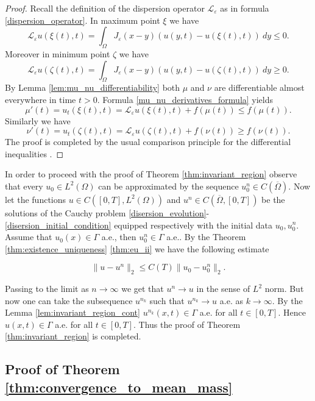 \documentclass[12pt, a4paper]{article}
\theoremstyle{break}
\theoremstyle{break}
\theoremstyle{break}
\theoremstyle{break}
\theoremstyle{break}
\newcommand{\Leo}{\mathcal{L}_{\varepsilon}}
\newcommand{\Leb}{L^2\left(\Omega\right)}
\begin{document}
\begin{proof}
    Recall the definition of the dispersion operator $\Leo$ as in formula \eqref{dispersion_operator}. In maximum point $\xi$ we have
    \begin{equation*}
        \Leo u(\xi(t), t) = \int_\Omega J_\varepsilon(x-y) \left(u(y, t) - u(\xi(t), t)\right)\:dy \leq 0.
    \end{equation*}
    Moreover in minimum point $\zeta$ we have
    \begin{equation*}
        \Leo u(\zeta(t), t) = \int_\Omega J_\varepsilon(x-y) \left(u(y, t) - u(\zeta(t), t)\right)\:dy \geq 0.
    \end{equation*}
    By Lemma \ref{lem:mu_nu_differentiability} both $\mu$ and $\nu$ are differentiable almost everywhere in time $t > 0$. Formula \eqref{mu_nu_derivatives_formula} yields
    $$\mu'(t) = u_t(\xi(t), t) = \Leo u(\xi(t), t) + f(\mu(t)) \leq f(\mu(t)).$$
    Similarly we have
    $$\nu'(t) = u_t(\zeta(t), t) = \Leo u(\zeta(t), t) + f(\nu(t)) \geq f(\nu(t)).$$
    The proof is completed by the usual comparison principle for the differential inequalities \cite{Petrovitch1901}.
\end{proof}
 
In order to proceed with the proof of Theorem \ref{thm:invariant_region} observe that every $u_0 \in L^2(\Omega)$ can be approximated by the sequence $u^n_0 \in C(\overline{\Omega})$. Now let the functions $u \in C([0, T], \Leb)$ and $u^n \in C(\overline{\Omega}, [0, T])$ be the solutions of the Cauchy problem \eqref{disersion_evolution}-\eqref{disersion_initial_condition} equipped respectively with the initial data $u_0, u^n_0$. Assume that $u_0(x) \in \Gamma$ a.e., then $u_0^n \in \Gamma$ a.e.. By the Theorem \ref{thm:existence_uniqueness} \ref{thm:eu_ii} we have the following estimate

\begin{equation*}
    \|u - u^n\|_2 \leq C(T)\|u_0 - u_0^n\|_2.
\end{equation*}

Passing to the limit as $n \rightarrow \infty$ we get that $u^n \rightarrow u$ in the sense of $L^2$ norm. But now one can take the subsequence $u^{n_k}$ such that $u^{n_k} \rightarrow u$ a.e. as $k \rightarrow \infty$. By the Lemma \ref{lem:invariant_region_cont} $u^{n_k}(x,t) \in \Gamma$ a.e. for all $t \in [0, T]$. Hence $u(x,t) \in \Gamma$ a.e. for all $t \in [0, T]$. Thus the proof of Theorem \ref{thm:invariant_region} is completed.

\subsection{Proof of Theorem \ref{thm:convergence_to_mean_mass}}
\end{document}
